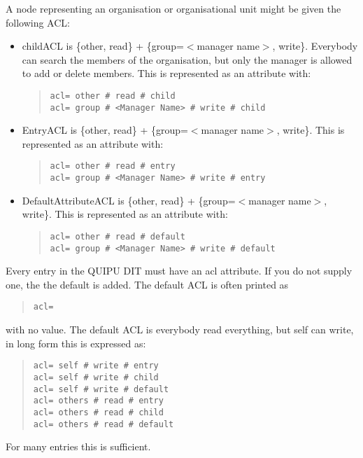 A node representing an organisation or organisational unit might be given the
following ACL:

\begin{itemize}
\item
childACL is \{other, read\} + \{group=$<$manager name$>$, write\}. Everybody can
search the members of the organisation, but only the manager is allowed to add
or delete members.
This is represented as an attribute with:
\begin{quote}\begin{verbatim}
acl= other # read # child
acl= group # <Manager Name> # write # child
\end{verbatim}\end{quote}
\item
EntryACL is \{other, read\} + \{group=$<$manager name$>$, write\}.
This is represented as an attribute with:
\begin{quote}\begin{verbatim}
acl= other # read # entry
acl= group # <Manager Name> # write # entry
\end{verbatim}\end{quote}
\item
DefaultAttributeACL is \{other, read\} + \{group=$<$manager name$>$, write\}.
This is represented as an attribute with:
\begin{quote}\begin{verbatim}
acl= other # read # default
acl= group # <Manager Name> # write # default
\end{verbatim}\end{quote}
\end{itemize}

Every entry in the QUIPU DIT must have an acl attribute.
If you do not supply one, the the default is added.
The default ACL is often printed as
\begin{quote}\begin{verbatim}
acl=
\end{verbatim}\end{quote}
with no value.
The default ACL is everybody read everything, but self can write, in long
form this is expressed as:
\begin{quote}\begin{verbatim}
acl= self # write # entry
acl= self # write # child
acl= self # write # default
acl= others # read # entry
acl= others # read # child
acl= others # read # default
\end{verbatim}\end{quote}
For many entries this is sufficient.  

